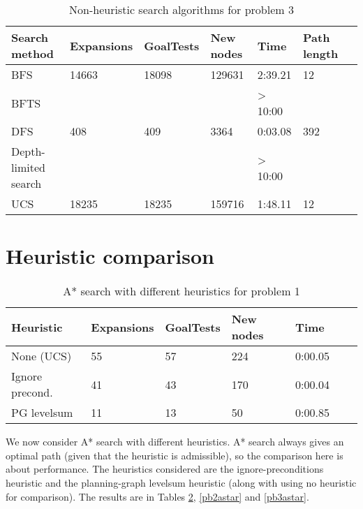 \documentclass[11pt]{article}
\begin{document}
\begin{table}[h]
\begin{center}
\begin{tabular}{|l|l|l|l|l|l|l|}
  \hline
  Search method & Expansions & GoalTests & New nodes & Time    & Path length \\
  \hline
  BFS           & 14663      & 18098     & 129631    & 2:39.21 & 12     \\
  \hline
  BFTS          &            &           &           & > 10:00 &       \\
  \hline
  DFS           & 408        & 409       & 3364      & 0:03.08 & 392    \\
  \hline
  Depth-limited search &     &           &           & > 10:00 &        \\
  \hline
  UCS           & 18235      & 18235     & 159716    & 1:48.11 & 12     \\
  \hline
\end{tabular}
\caption{Non-heuristic search algorithms for problem 3} \label{pb3}
\end{center}
\end{table}

\section{Heuristic comparison}
\begin{table}[h]
\begin{center}
\begin{tabular}{|l|l|l|l|l|l|l}
  \hline
  Heuristic & Expansions & GoalTests & New nodes & Time    \\
  \hline
  None (UCS)& 55         & 57        & 224       & 0:00.05 \\
  \hline
  Ignore precond.& 41    & 43        & 170      & 0:00.04 \\
  \hline
  PG levelsum    & 11    & 13        & 50       & 0:00.85 \\
  \hline
\end{tabular}
\caption{A* search with different heuristics for problem 1} \label{pb1astar}
\end{center}
\end{table}

We now consider A* search with different heuristics. A* search always gives an optimal path (given that the heuristic is admissible), so the comparison here is about performance. The heuristics considered are the ignore-preconditions heuristic and the planning-graph levelsum heuristic (along with using no heuristic for comparison). The results are in Tables \ref{pb1astar}, \ref{pb2astar} and \ref{pb3astar}.
\end{document}
